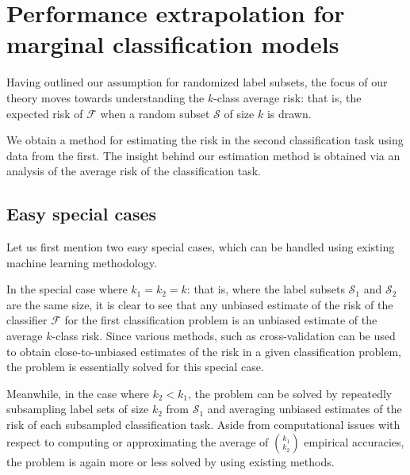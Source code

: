 \documentclass[12pt]{article}
\begin{document}





\section{Performance extrapolation for marginal classification models}

Having outlined our assumption for randomized label subsets, the focus
of our theory moves towards understanding the $k$-class average risk:
that is, the expected risk of $\mathcal{F}$ when a random subset
$\mathcal{S}$ of size $k$ is drawn.

We obtain a method for estimating the risk in the second
classification task using data from the first.  The insight behind our
estimation method is obtained via an analysis of the average risk of
the classification task.

\subsection{Easy special cases}

Let us first mention two easy special cases, which can be handled
using existing machine learning methodology.

In the special case where $k_1 = k_2 = k$: that is, where the label
subsets $\mathcal{S}_1$ and $\mathcal{S}_2$ are the same size, it is
clear to see that any unbiased estimate of the risk of the classifier
$\mathcal{F}$ for the first classification problem is an unbiased
estimate of the average $k$-class risk.  Since various methods, such
as cross-validation can be used to obtain close-to-unbiased estimates
of the risk in a given classification problem, the problem is
essentially solved for this special case.

Meanwhile, in the case where $k_2 < k_1$, the problem can be solved by
repeatedly subsampling label sets of size $k_2$ from $\mathcal{S}_1$
and averaging unbiased estimates of the risk of each subsampled
classification task.  Aside from computational issues with respect to
computing or approximating the average of ${k_1}\choose{k_2}$
empirical accuracies, the problem is again more or less solved by
using existing methods.
\end{document}
